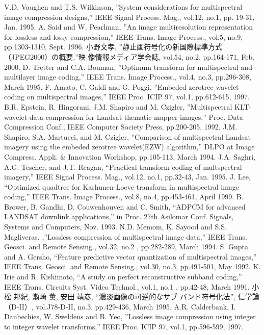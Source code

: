 
\renewcommand{\bibname}{参考文献}
\begin{thebibliography}{99}
V.D. Vaughen and T.S. Wilkinson, ''System considerations for
	multispectral image compression designs,'' IEEE Signal
	Process. Mag., vol.12, no.1, pp. 19-31, Jan. 1995.
A. Said and W. Pearlman, ''An image multiresolution representation
	for lossless and lossy compression,'' IEEE Trans. Image
	Process., vol.5, no.9, pp.1303-1310, Sept. 1996.
小野文孝, ''静止画符号化の新国際標準方式（JPEG2000）の概要,''映
	像情報メディア学会誌, vol.54, no.2, pp.164-171, Feb. 2000.
D. Tretter and C.A. Bouman, ''Optimum transform for multispectral
	and multilayer image coding,'' IEEE Trans. Image Process., vol.4, no.3, pp.296-308,
	March 1995.
F. Amato, C. Galdi and G. Poggi, ''Embeded zerotree wavelet
	coding on multispectral images,'' IEEE Proc. ICIP 97, vol.1, pp.612-615, 1997.
B.R. Epstein, R. Hingorani, J.M. Shapiro and
	M. Czigler, ''Multispectral KLT-wavelet data compression for
	Landsat thematic mapper images,'' Proc. Data Compression
	Conf., IEEE Computer Society Press, pp.200-205, 1992.
J.M. Shapiro, S.A. Martucci, and M. Czigler, ''Comparison of
	multispectral Landsat imagery using the embeded zerotree
	wavelet(EZW) algorithm,'' DLPO at Image Compress. Appli. \&
	Innovation Workshop, pp.105-113, March 1994. 
J.A. Saghri, A.G. Tescher, and J.T. Reagan, ``Practical transform
	coding of multspectral imagery,'' IEEE Signal Process. Mag.,
	vol.12, no.1, pp.32-43, Jan. 1995.
J. Lee, ``Optimized quadtree for Karhunen-Loeve transform in
	multispectral image coding,'' IEEE Trans. Image Process., vol.8, no.4,
	pp.453-461, April 1999.
B. Brower, B. Gandhi, D. Couwenhouven and C. Smith, ``ADPCM
	for advanced LANDSAT downlink applications,'' in Proc. 27th
	Asilomar Conf. Signals, Systems and Computers, Nov. 1993. 
N.D. Memom, K. Sayood and S.S. Magliveras. ,''Lossless compression
	of multispectral image data,'' IEEE Trans. Geosci. and
	Remote Sensing., vol.32, no.2 , pp.282-289, March 1994.
S. Gupta and A. Gersho, ``Feature predictive vector quantization
	of multispectral images,'' IEEE Trans. Geosci. and
	Remote Sensing., vol.30, no.3, pp.491-501, May 1992.
K. Irie and R. Kishimoto, ``A study on perfect reconstructive
	subband coding,'' IEEE Trans. Circuits Syst. Video Technol.,
	vol.1, no.1 , pp.42-48, March 1991.
 小松 邦紀, 瀬崎 薫, 安田 靖彦, ``濃淡画像の可逆的なサブ
	バンド符号化法'', 信学論（D-II）, vol.J78-D-II, no.3,
	pp.429-436, March 1995.
A.R. Calderbank, I. Daubechies, W. Sweldens and B. Yeo, ''Lossless
	image compression using integer to integer wavelet transforms,'' 
	IEEE Proc. ICIP 97, vol.1, pp.596-599, 1997.


\end{thebibliography}

